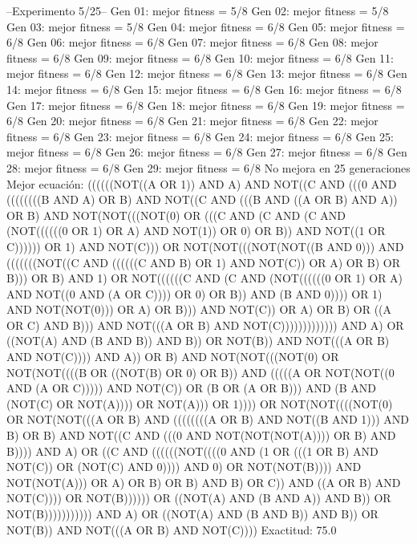 --Experimento 
 5/25--
Gen 01: mejor fitness = 5/8
Gen 02: mejor fitness = 5/8
Gen 03: mejor fitness = 5/8
Gen 04: mejor fitness = 6/8
Gen 05: mejor fitness = 6/8
Gen 06: mejor fitness = 6/8
Gen 07: mejor fitness = 6/8
Gen 08: mejor fitness = 6/8
Gen 09: mejor fitness = 6/8
Gen 10: mejor fitness = 6/8
Gen 11: mejor fitness = 6/8
Gen 12: mejor fitness = 6/8
Gen 13: mejor fitness = 6/8
Gen 14: mejor fitness = 6/8
Gen 15: mejor fitness = 6/8
Gen 16: mejor fitness = 6/8
Gen 17: mejor fitness = 6/8
Gen 18: mejor fitness = 6/8
Gen 19: mejor fitness = 6/8
Gen 20: mejor fitness = 6/8
Gen 21: mejor fitness = 6/8
Gen 22: mejor fitness = 6/8
Gen 23: mejor fitness = 6/8
Gen 24: mejor fitness = 6/8
Gen 25: mejor fitness = 6/8
Gen 26: mejor fitness = 6/8
Gen 27: mejor fitness = 6/8
Gen 28: mejor fitness = 6/8
Gen 29: mejor fitness = 6/8
No mejora en 25 generaciones
Mejor ecuación: ((((((NOT((A OR 1)) AND A) AND NOT((C AND (((0 AND ((((((((B AND A) OR B) AND NOT((C AND (((B AND ((A OR B) AND A)) OR B) AND NOT(NOT(((NOT(0) OR (((C AND (C AND (C AND (NOT((((((0 OR 1) OR A) AND NOT(1)) OR 0) OR B)) AND NOT((1 OR C)))))) OR 1) AND NOT(C))) OR NOT(NOT(((NOT(NOT((B AND 0))) AND (((((((NOT((C AND ((((((C AND B) OR 1) AND NOT(C)) OR A) OR B) OR B))) OR B) AND 1) OR NOT((((((C AND (C AND (NOT((((((0 OR 1) OR A) AND NOT((0 AND (A OR C)))) OR 0) OR B)) AND (B AND 0)))) OR 1) AND NOT(NOT(0))) OR A) OR B))) AND NOT(C)) OR A) OR B) OR ((A OR C) AND B))) AND NOT(((A OR B) AND NOT(C))))))))))))) AND A) OR ((NOT(A) AND (B AND B)) AND B)) OR NOT(B)) AND NOT(((A OR B) AND NOT(C)))) AND A)) OR B) AND NOT(NOT(((NOT(0) OR NOT(NOT((((B OR ((NOT(B) OR 0) OR B)) AND (((((A OR NOT(NOT((0 AND (A OR C))))) AND NOT(C)) OR (B OR (A OR B))) AND (B AND (NOT(C) OR NOT(A)))) OR NOT(A))) OR 1)))) OR NOT(NOT((((NOT(0) OR NOT(NOT(((A OR B) AND ((((((((A OR B) AND NOT((B AND 1))) AND B) OR B) AND NOT((C AND (((0 AND NOT(NOT(NOT(A)))) OR B) AND B)))) AND A) OR ((C AND ((((((NOT((((0 AND (1 OR (((1 OR B) AND NOT(C)) OR (NOT(C) AND 0)))) AND 0) OR NOT(NOT(B)))) AND NOT(NOT(A))) OR A) OR B) OR B) AND B) OR C)) AND ((A OR B) AND NOT(C)))) OR NOT(B)))))) OR ((NOT(A) AND (B AND A)) AND B)) OR NOT(B))))))))))) AND A) OR ((NOT(A) AND (B AND B)) AND B)) OR NOT(B)) AND NOT(((A OR B) AND NOT(C))))
 Exactitud: 75.0%

